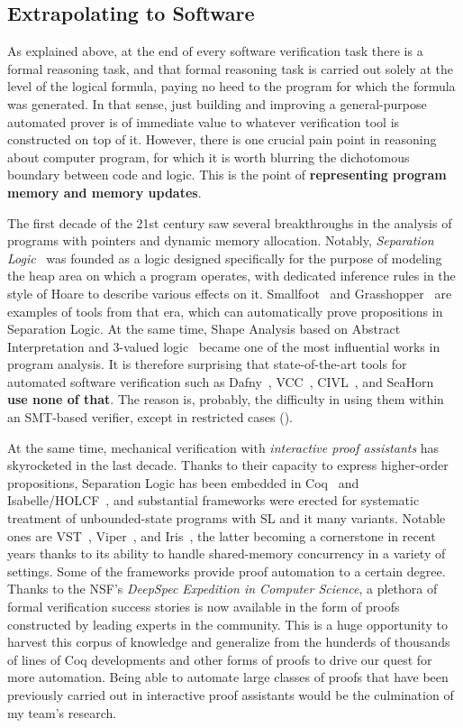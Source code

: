 \subsection{Extrapolating to Software}

As explained above, at the end of every software verification task there is a formal reasoning task, and that formal reasoning task is carried out solely at the level of the logical formula, paying no heed to the program for which the formula was generated.
In that sense, just building and improving a general-purpose automated prover is of immediate value to whatever verification tool is constructed on top of it.
However, there is one crucial pain point in reasoning about computer program, for which it is worth blurring the dichotomous boundary between code and logic.
This is the point of \textbf{representing program memory and memory updates}.

The first decade of the 21st century saw several breakthroughs in the analysis of programs with pointers and dynamic memory allocation.
Notably, \emph{Separation Logic}~\cite{LICS2002:Reynolds} was founded as a logic designed specifically for the purpose of modeling the heap area on which a program operates,
with dedicated inference rules in the style of Hoare to describe various effects on it.
Smallfoot~\cite{FMCO2005:Berdine} and Grasshopper~\cite{weis} are examples of tools from that era, which can automatically prove propositions in Separation Logic.
At the same time, Shape Analysis based on Abstract Interpretation and 3-valued logic~\cite{sagiv-reps} became one of the most influential works in program analysis.
It is therefore surprising that state-of-the-art tools for automated software verification such as Dafny~\cite{dafny}, VCC~\cite{vcc}, CIVL~\cite{civl}, and SeaHorn~\cite{seahorn} \textbf{use none of that}.
The reason is, probably, the difficulty in using them within an SMT-based verifier, except in restricted cases
(\eg \cite{CAV2013:Piskac}).

At the same time, mechanical verification with \emph{interactive proof assistants} has skyrocketed in the last decade.
Thanks to their capacity to express higher-order propositions, Separation Logic has been embedded in Coq~\cite{nanevski} and Isabelle/HOLCF~\cite{MFPS2008:Varming},
and substantial frameworks were erected for systematic treatment of unbounded-state programs with SL and it many variants.
Notable ones are VST~\cite{JAR2018:Cao}, Viper~\cite{viper}, and Iris~\cite{iris}, the latter becoming a cornerstone in recent years thanks to its ability to handle shared-memory concurrency in a variety of settings.
Some of the frameworks provide proof automation to a certain degree.
Thanks to the NSF's \emph{DeepSpec Expedition in Computer Science}, a plethora of formal verification success stories is now available in the form of proofs constructed by leading experts in the community.
This is a huge opportunity to harvest this corpus of knowledge and generalize from the hunderds of thousands of lines of Coq developments and other forms of proofs to drive our quest for more automation.
Being able to automate large classes of proofs that have been previously carried out in interactive proof assistants would be the culmination of my team's research.

